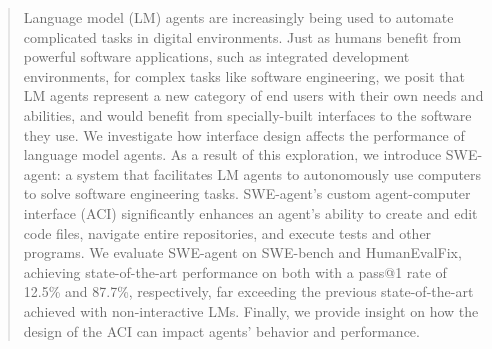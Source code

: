 \begin{abstract}
Language model (LM) agents are increasingly being used to automate complicated tasks in digital environments.
Just as humans benefit from powerful software applications, such as integrated development environments, for complex tasks like software engineering, we posit that LM agents represent a new category of end users with their own needs and abilities, and would benefit from specially-built interfaces to the software they use.
We investigate how interface design affects the performance of language model agents.
As a result of this exploration, we introduce SWE-agent: a system that facilitates LM agents to autonomously use computers to solve software engineering tasks.
SWE-agent's custom agent-computer interface (ACI) significantly enhances an agent's ability to create and edit code files, navigate entire repositories, and execute tests and other programs.
We evaluate SWE-agent on SWE-bench and HumanEvalFix, achieving state-of-the-art performance on both with a pass@\num{1} rate of \num{12.5}\% and \num{87.7}\%, respectively, far exceeding the previous state-of-the-art achieved with non-interactive LMs.
Finally, we provide insight on how the design of the ACI can impact agents' behavior and performance.
\end{abstract}

